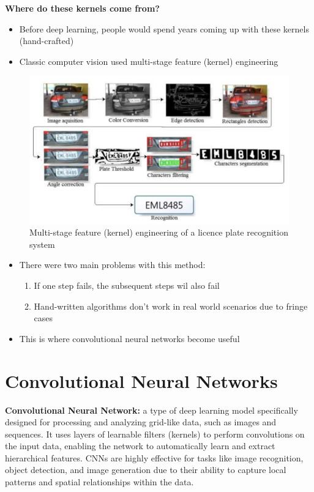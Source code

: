 \textbf{Where do these kernels come from?}

\begin{itemize}
    \item Before deep learning, people would spend years coming up with these kernels (hand-crafted)
    \item Classic computer vision used multi-stage feature (kernel) engineering
\end{itemize}

\begin{figure}[h!t]
    \centering
    \includegraphics[width=0.5\linewidth]{multistagekerneleng.png}
    \caption{Multi-stage feature (kernel) engineering of a licence plate recognition system}
    \label{fig:enter-label}
\end{figure}

\begin{itemize}
    \item There were two main problems with this method:
    \begin{enumerate}
        \item If one step fails, the subsequent steps wil also fail
        \item Hand-written algorithms don't work in real world scenarios due to fringe cases
    \end{enumerate}
\end{itemize}
\begin{itemize}
    \item This is where convolutional neural networks become useful
\end{itemize}

\section{Convolutional Neural Networks}

\begin{definition}
    \textbf{Convolutional Neural Network:} a type of deep learning model specifically designed for processing and analyzing grid-like data, such as images and sequences. It uses layers of learnable filters (kernels) to perform convolutions on the input data, enabling the network to automatically learn and extract hierarchical features. CNNs are highly effective for tasks like image recognition, object detection, and image generation due to their ability to capture local patterns and spatial relationships within the data.
\end{definition}

